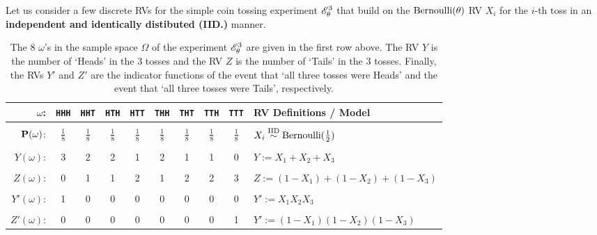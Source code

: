 Let us consider a few discrete RVs for the simple coin tossing experiment $\mathscr{E}_{\theta}^{3}$ that build on the $\mbox{{\rm Bernoulli}}(\theta)$ RV $X_i$ for the $i$-th toss in an {\bf independent and identically distibuted (IID.)} manner.
\begin{table}[htpb]
\caption{The $8$ $\omega$'s in the sample space $\Omega$ of the experiment $\mathscr{E}_{\theta}^{3}$ are given in the first row above.  The RV $Y$ is the number of `Heads' in the $3$ tosses and the RV $Z$ is the number of `Tails' in the $3$ tosses.  Finally, the RVs $Y'$ and $Z'$ are the indicator functions of the event that `all three tosses were Heads' and the event that `all three tosses were Tails', respectively.\label{T:T3XRVs}}
 \begin{tabular}{r c c c c c c c c l}
 \hline
$\omega$:    & {\tt HHH} & {\tt HHT} & {\tt HTH} & {\tt HTT} & {\tt THH} & {\tt THT} & {\tt TTH} & {\tt TTT} & RV Definitions / Model \\ \hline
 \\
$\mathbf{P}(\omega)$: & $\frac{1}{8}$ & $\frac{1}{8}$ & $\frac{1}{8}$ & $\frac{1}{8}$ &  $\frac{1}{8}$ & $\frac{1}{8}$ & $\frac{1}{8}$ & $\frac{1}{8}$  & $X_i \overset{{\rm IID}}{\sim} \mbox{{\rm Bernoulli}}(\frac{1}{2})$ \\
 \\
$Y(\omega)$: & 3         & 2         & 2         & 1         & 2         & 1         & 1         & 0        & $Y := X_1+X_2+X_3$ \\
 \\
$Z(\omega)$: & 0         & 1         & 1         & 2         & 1         & 2         & 2         & 3        & $Z := (1-X_1)+(1-X_2)+(1-X_3)$ \\
 \\
$Y'(\omega)$: & 1         & 0         & 0         & 0         & 0         & 0         & 0         & 0       & $Y' :=  X_1 X_2 X_3$ \\
\\
$Z'(\omega)$: & 0         & 0         & 0         & 0         & 0         & 0         & 0         & 1       & $Y' :=  (1-X_1)(1-X_2)(1-X_3)$ \\ \hline
 \end{tabular}
 \end{table}
